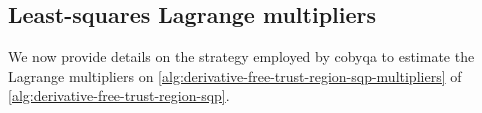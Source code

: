 
\subsection{Least-squares Lagrange multipliers}
\label{subsec:least-squares-lagrange-multipliers}

We now provide details on the strategy employed by \gls{cobyqa} to estimate the Lagrange multipliers on \cref{alg:derivative-free-trust-region-sqp-multipliers} of \cref{alg:derivative-free-trust-region-sqp}.

